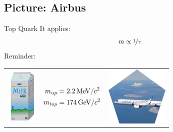 \subsection{Picture: Airbus}
\begin{frame}{Top Quark}
It applies:
    \[ m \propto \nicefrac{1}{\tau} \] %
     Reminder:

    \begin{table}[]
    \centering
    \begin{tabular}{ccc}
       \includegraphics[width=1.5cm]{Figures Lecture on Hadrons/SevenMountainsMilk.png}  &\parbox{4cm}{\vspace{-3cm}\begin{align*}m_{up}&= 2.2\,\textmd{MeV}/c^2 \\m_{top}&=174\,\textmd{GeV}/c^2 \end{align*}} & \includegraphics[width=3cm]{Figures Lecture on Hadrons/Airbus A321Neo.jpg}
       \end{tabular}  
\end{table}

\begin{center}
     \\
   \end{center}
    \end{frame}

